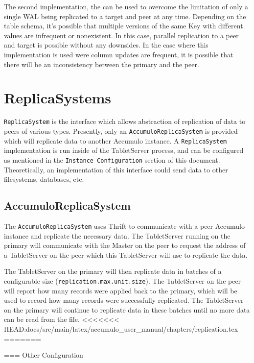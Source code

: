 The second implementation, the  can be used to overcome the limitation
of only a single WAL being replicated to a target and peer at any time. Depending on the table schema,
it's possible that multiple versions of the same Key with different values are infrequent or nonexistent.
In this case, parallel replication to a peer and target is possible without any downsides. In the case
where this implementation is used were column updates are frequent, it is possible that there will be
an inconsistency between the primary and the peer.

\section{ReplicaSystems}

\texttt{ReplicaSystem} is the interface which allows abstraction of replication of data
to peers of various types. Presently, only an \texttt{AccumuloReplicaSystem} is provided
which will replicate data to another Accumulo instance. A \texttt{ReplicaSystem} implementation
is run inside of the TabletServer process, and can be configured as mentioned in the 
\texttt{Instance Configuration} section of this document. Theoretically, an implementation
of this interface could send data to other filesystems, databases, etc.

\subsection{ AccumuloReplicaSystem}

The \texttt{AccumuloReplicaSystem} uses Thrift to communicate with a peer Accumulo instance
and replicate the necessary data. The TabletServer running on the primary will communicate
with the Master on the peer to request the address of a TabletServer on the peer which
this TabletServer will use to replicate the data.

The TabletServer on the primary will then replicate data in batches of a configurable
size (\texttt{replication.max.unit.size}). The TabletServer on the peer will report how many
records were applied back to the primary, which will be used to record how many records
were successfully replicated. The TabletServer on the primary will continue to replicate
data in these batches until no more data can be read from the file.
<<<<<<< HEAD:docs/src/main/latex/accumulo_user_manual/chapters/replication.tex
=======

=== Other Configuration

